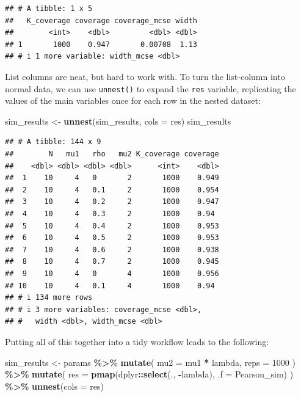 \documentclass[
]{book}
\newenvironment{Shaded}{\begin{snugshade}}{\end{snugshade}}
\newcommand{\AttributeTok}[1]{\textcolor[rgb]{0.13,0.29,0.53}{#1}}
\newcommand{\DecValTok}[1]{\textcolor[rgb]{0.00,0.00,0.81}{#1}}
\newcommand{\FunctionTok}[1]{\textcolor[rgb]{0.13,0.29,0.53}{\textbf{#1}}}
\newcommand{\NormalTok}[1]{#1}
\newcommand{\OtherTok}[1]{\textcolor[rgb]{0.56,0.35,0.01}{#1}}
\newcommand{\SpecialCharTok}[1]{\textcolor[rgb]{0.81,0.36,0.00}{\textbf{#1}}}
\begin{document}
\begin{verbatim}
## # A tibble: 1 x 5
##   K_coverage coverage coverage_mcse width
##        <int>    <dbl>         <dbl> <dbl>
## 1       1000    0.947       0.00708  1.13
## # i 1 more variable: width_mcse <dbl>
\end{verbatim}

List columns are neat, but hard to work with.
To turn the list-column into normal data, we can use \texttt{unnest()} to expand the \texttt{res} variable, replicating the values of the main variables once for each row in the nested dataset:

\begin{Shaded}
\begin{Highlighting}[]
\NormalTok{sim\_results }\OtherTok{\textless{}{-}} \FunctionTok{unnest}\NormalTok{(sim\_results, }\AttributeTok{cols =}\NormalTok{ res)}
\NormalTok{sim\_results}
\end{Highlighting}
\end{Shaded}

\begin{verbatim}
## # A tibble: 144 x 9
##        N   mu1   rho   mu2 K_coverage coverage
##    <dbl> <dbl> <dbl> <dbl>      <int>    <dbl>
##  1    10     4   0       2       1000    0.949
##  2    10     4   0.1     2       1000    0.954
##  3    10     4   0.2     2       1000    0.947
##  4    10     4   0.3     2       1000    0.94 
##  5    10     4   0.4     2       1000    0.953
##  6    10     4   0.5     2       1000    0.953
##  7    10     4   0.6     2       1000    0.938
##  8    10     4   0.7     2       1000    0.945
##  9    10     4   0       4       1000    0.956
## 10    10     4   0.1     4       1000    0.94 
## # i 134 more rows
## # i 3 more variables: coverage_mcse <dbl>,
## #   width <dbl>, width_mcse <dbl>
\end{verbatim}

Putting all of this together into a tidy workflow leads to the following:

\begin{Shaded}
\begin{Highlighting}[]
\NormalTok{sim\_results }\OtherTok{\textless{}{-}} 
\NormalTok{  params }\SpecialCharTok{\%\textgreater{}\%}
  \FunctionTok{mutate}\NormalTok{(}
    \AttributeTok{mu2 =}\NormalTok{ mu1 }\SpecialCharTok{*}\NormalTok{ lambda,}
    \AttributeTok{reps =} \DecValTok{1000}
\NormalTok{  ) }\SpecialCharTok{\%\textgreater{}\%}
  \FunctionTok{mutate}\NormalTok{(}
    \AttributeTok{res =} \FunctionTok{pmap}\NormalTok{(dplyr}\SpecialCharTok{::}\FunctionTok{select}\NormalTok{(., }\SpecialCharTok{{-}}\NormalTok{lambda), }\AttributeTok{.f =}\NormalTok{ Pearson\_sim)}
\NormalTok{  ) }\SpecialCharTok{\%\textgreater{}\%}
  \FunctionTok{unnest}\NormalTok{(}\AttributeTok{cols =}\NormalTok{ res)}
\end{Highlighting}
\end{Shaded}
\end{document}
